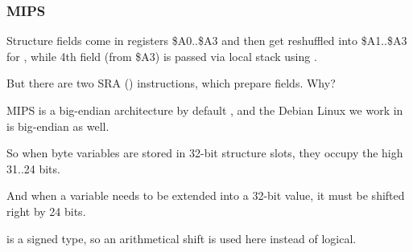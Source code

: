 \subsubsection{MIPS}
\label{MIPS_structure_big_endian}



Structure fields come in registers \$A0..\$A3 and then get reshuffled into \$A1..\$A3 for \printf,
while 4th field (from \$A3) is passed via local stack using .

But there are two SRA () instructions, which prepare \Tchar fields.
Why?

MIPS is a big-endian architecture by default , and the Debian Linux we work in is big-endian as well.

So when byte variables are stored in 32-bit structure slots, they occupy the high 31..24 bits.

And when a \Tchar variable needs to be extended into a 32-bit value, it must be shifted right by 24 bits.

\Tchar is a signed type, so an arithmetical shift is used here instead of logical.
